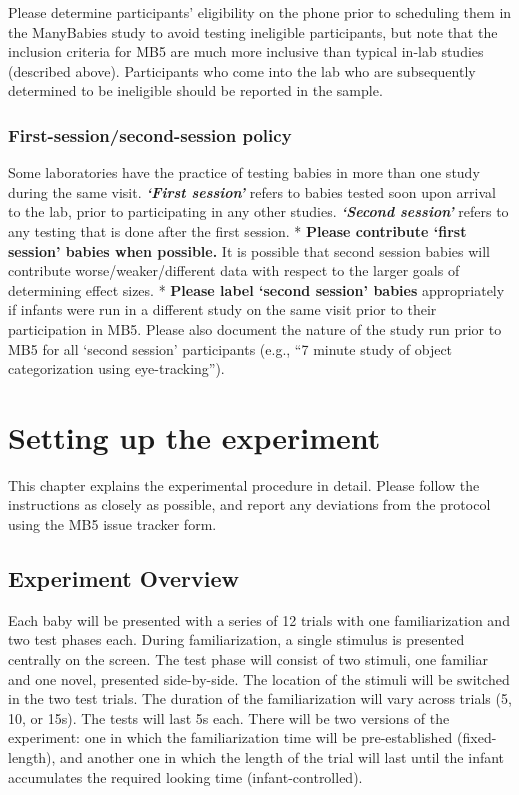 \documentclass[
]{book}
\begin{document}
Please determine participants' eligibility on the phone prior to scheduling them in the ManyBabies study to avoid testing ineligible participants, but note that the inclusion criteria for MB5 are much more inclusive than typical in-lab studies (described above). Participants who come into the lab who are subsequently determined to be ineligible should be reported in the sample.

\subsection{First-session/second-session policy}\label{first-sessionsecond-session-policy}

Some laboratories have the practice of testing babies in more than one study during the same visit. \textbf{\emph{`First session'}} refers to babies tested soon upon arrival to the lab, prior to participating in any other studies. \textbf{\emph{`Second session'}} refers to any testing that is done after the first session.
* \textbf{Please contribute `first session' babies when possible.} It is possible that second session babies will contribute worse/weaker/different data with respect to the larger goals of determining effect sizes.
* \textbf{Please label `second session' babies} appropriately if infants were run in a different study on the same visit prior to their participation in MB5. Please also document the nature of the study run prior to MB5 for all `second session' participants (e.g., ``7 minute study of object categorization using eye-tracking'').

\chapter{Setting up the experiment}\label{setting-up-the-experiment}

This chapter explains the experimental procedure in detail. Please follow the instructions as closely as possible, and report any deviations from the protocol using the MB5 issue tracker form.

\section{Experiment Overview}\label{experiment-overview}

Each baby will be presented with a series of 12 trials with one familiarization and two test phases each. During familiarization, a single stimulus is presented centrally on the screen. The test phase will consist of two stimuli, one familiar and one novel, presented side-by-side. The location of the stimuli will be switched in the two test trials. The duration of the familiarization will vary across trials (5, 10, or 15s). The tests will last 5s each. There will be two versions of the experiment: one in which the familiarization time will be pre-established (fixed-length), and another one in which the length of the trial will last until the infant accumulates the required looking time (infant-controlled).
\end{document}
